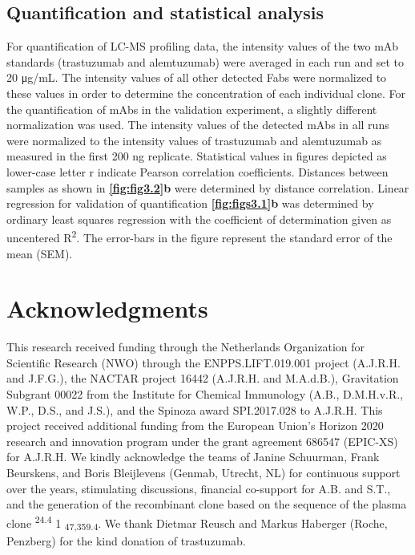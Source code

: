 \subsection{Quantification and statistical analysis}
For quantification of LC-MS profiling data, the intensity values of the two mAb standards (trastuzumab and alemtuzumab) were averaged in each run and set to 20 μg/mL. The intensity values of all other detected Fabs were normalized to these values in order to determine the concentration of each individual clone. For the quantification of mAbs in the validation experiment, a slightly different normalization was used. The intensity values of the detected mAbs in all runs were normalized to the intensity values of trastuzumab and alemtuzumab as measured in the first 200 ng replicate.
Statistical values in figures depicted as lower-case letter r indicate Pearson correlation coefficients. Distances between samples as shown in \textbf{\autoref{fig:fig3.2}b} were determined by distance correlation. Linear regression for validation of quantification \textbf{\autoref{fig:figs3.1}b} was determined by ordinary least squares regression with the coefficient of determination given as uncentered R\textsuperscript{2}. The error-bars in the figure represent the standard error of the mean (SEM).

\section{Acknowledgments}
This research received funding through the Netherlands Organization for Scientific Research (NWO) through the ENPPS.LIFT.019.001 project (A.J.R.H. and J.F.G.), the NACTAR project 16442 (A.J.R.H. and M.A.d.B.), Gravitation Subgrant 00022 from the Institute for Chemical Immunology (A.B., D.M.H.v.R., W.P., D.S., and J.S.), and the Spinoza award SPI.2017.028 to A.J.R.H. This project received additional funding from the European Union’s Horizon 2020 research and innovation program under the grant agreement 686547 (EPIC-XS) for A.J.R.H. We kindly acknowledge the teams of Janine Schuurman, Frank Beurskens, and Boris Bleijlevens (Genmab, Utrecht, NL) for continuous support over the years, stimulating discussions, financial co-support for A.B. and S.T., and the generation of the recombinant clone based on the sequence of the plasma clone \textsuperscript{24.4} 1 \textsubscript{47,359.4}. We thank Dietmar Reusch and Markus Haberger (Roche, Penzberg) for the kind donation of trastuzumab.


